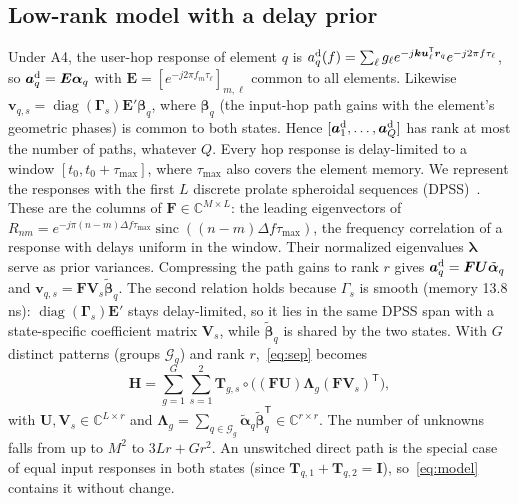 \documentclass[conference,10pt]{IEEEtran}
\theoremstyle{remark}
\DeclareMathOperator{\diag}{diag}
\DeclareMathOperator{\sinc}{sinc}
\newcommand{\T}{\mathsf T}
\begin{document}
\subsection{Low-rank model with a delay prior}
Under A4, the user-hop response of element $q$ is $a^{\rm d}_q(f)=\sum_{\ell}g_\ell e^{-j\bm k\bm u_\ell^{\T}\bm r_q}
e^{-j2\pi f\tau_\ell}$, so $\bm a^{\rm d}_q=\bm E\bm\alpha_q$ with $\bm E=[e^{-j2\pi f_m\tau_\ell}]_{m,\ell}$ common to all
elements. Likewise $\bm v_{q,s}=\diag(\bm\Gamma_s)\bm E'\bm\beta_q$, where $\bm\beta_q$ (the input-hop path gains with the
element's geometric phases) is common to both states. Hence $[\bm a^{\rm d}_1,\dots,\bm a^{\rm d}_Q]$ has rank at most
the number of paths, whatever $Q$. Every hop response is delay-limited to a window $[t_0,t_0+\tau_{\max}]$, where
$\tau_{\max}$ also covers the element memory. We represent the responses with the first $L$ discrete prolate spheroidal
sequences (DPSS)~\cite{slepian1978,zemen2005}. These are the columns of $\bm F\in\mathbb C^{M\times L}$: the leading
eigenvectors of $R_{nm}=e^{-j\pi(n-m)\Delta f\tau_{\max}}\sinc((n-m)\Delta f\tau_{\max})$, the frequency correlation
of a response with delays uniform in the window. Their normalized eigenvalues $\bm\lambda$ serve as prior variances. Compressing the path gains to rank $r$ gives
$\bm a^{\rm d}_q=\bm F\bm U\tilde{\bm\alpha}_q$ and $\bm v_{q,s}=\bm F\bm V_s\tilde{\bm\beta}_q$. The second relation holds
because $\Gamma_s$ is smooth (memory 13.8\,ns): $\diag(\bm\Gamma_s)\bm E'$ stays delay-limited, so it lies in the same
DPSS span with a state-specific coefficient matrix $\bm V_s$, while $\tilde{\bm\beta}_q$ is shared by the two states. With
$G$ distinct patterns (groups $\mathcal G_g$) and rank $r$,~\eqref{eq:sep} becomes
\begin{equation}
\bm H=\sum_{g=1}^{G}\sum_{s=1}^{2}\bm T_{g,s}\circ\big((\bm F\bm U)\bm\Lambda_g(\bm F\bm V_s)^{\T}\big),\label{eq:model}
\end{equation}
with $\bm U,\bm V_s\in\mathbb C^{L\times r}$ and $\bm\Lambda_g=\sum_{q\in\mathcal G_g}\tilde{\bm\alpha}_q\tilde{\bm\beta}_q^{\T}
\in\mathbb C^{r\times r}$. The number of unknowns falls from up to $M^2$ to $3Lr+Gr^2$. An unswitched direct path is the
special case of equal input responses in both states (since $\bm T_{q,1}+\bm T_{q,2}=\bm I$), so~\eqref{eq:model}
contains it without change.
\end{document}
